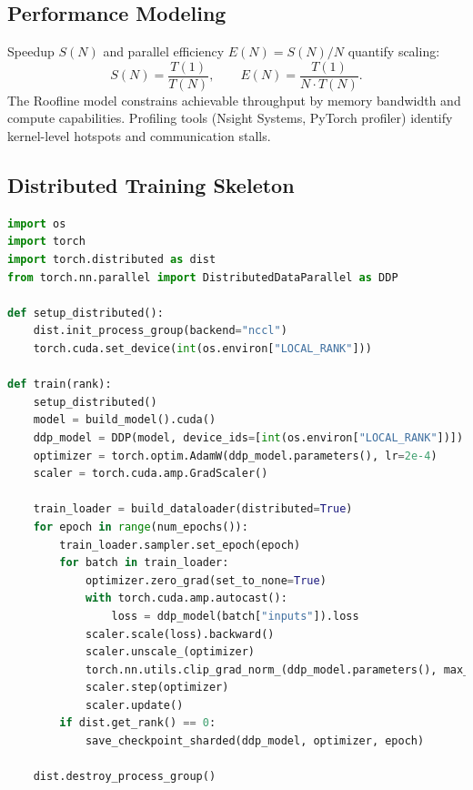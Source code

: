 \documentclass{article}
\begin{document}
\subsection{Performance Modeling}
Speedup $S(N)$ and parallel efficiency $E(N) = S(N) / N$ quantify scaling:
\begin{equation}
  S(N) = \frac{T(1)}{T(N)}, \qquad E(N) = \frac{T(1)}{N \cdot T(N)}.
\end{equation}
The Roofline model constrains achievable throughput by memory bandwidth and compute capabilities. Profiling tools (Nsight Systems, PyTorch profiler) identify kernel-level hotspots and communication stalls.

\subsection{Distributed Training Skeleton}

\begin{lstlisting}[language=Python, caption={PyTorch DistributedDataParallel training skeleton with elastic restart hooks.}]
import os
import torch
import torch.distributed as dist
from torch.nn.parallel import DistributedDataParallel as DDP

def setup_distributed():
    dist.init_process_group(backend="nccl")
    torch.cuda.set_device(int(os.environ["LOCAL_RANK"]))

def train(rank):
    setup_distributed()
    model = build_model().cuda()
    ddp_model = DDP(model, device_ids=[int(os.environ["LOCAL_RANK"])])
    optimizer = torch.optim.AdamW(ddp_model.parameters(), lr=2e-4)
    scaler = torch.cuda.amp.GradScaler()

    train_loader = build_dataloader(distributed=True)
    for epoch in range(num_epochs()):
        train_loader.sampler.set_epoch(epoch)
        for batch in train_loader:
            optimizer.zero_grad(set_to_none=True)
            with torch.cuda.amp.autocast():
                loss = ddp_model(batch["inputs"]).loss
            scaler.scale(loss).backward()
            scaler.unscale_(optimizer)
            torch.nn.utils.clip_grad_norm_(ddp_model.parameters(), max_norm=1.0)
            scaler.step(optimizer)
            scaler.update()
        if dist.get_rank() == 0:
            save_checkpoint_sharded(ddp_model, optimizer, epoch)

    dist.destroy_process_group()
\end{lstlisting}
\end{document}
